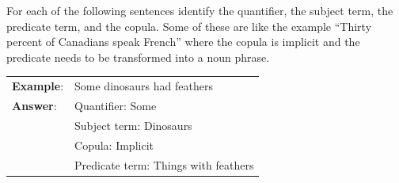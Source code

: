 
\practiceproblems
\problempart For each of the following sentences identify the quantifier, the subject term, the predicate term, and the copula. Some of these are like the example ``Thirty percent of Canadians speak French'' where the copula is implicit and the predicate needs to be transformed into a noun phrase. 

\begin{longtabu}{p{.1\linewidth}p{.9\linewidth}}
\textbf{Example}: & Some dinosaurs had feathers\\
\textbf{Answer}: & Quantifier: Some \\
&Subject term: Dinosaurs \\
&Copula: Implicit \\
& Predicate term: Things with feathers \\
\end{longtabu}

